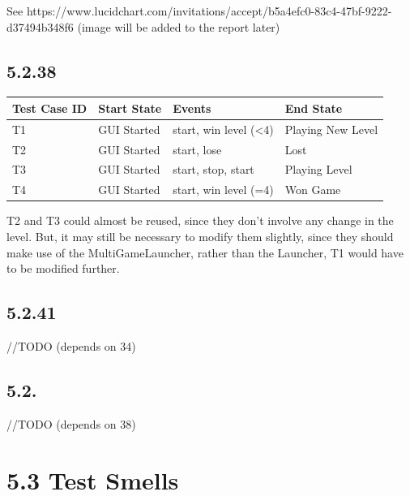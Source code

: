 \documentclass[]{article}
\begin{document}
See
https://www.lucidchart.com/invitations/accept/b5a4efc0-83c4-47bf-9222-d37494b348f6
(image will be added to the report later)

\subsection{5.2.38}\label{section-23}

\begin{longtable}[]{@{}llll@{}}
\toprule
Test Case ID & Start State & Events & End State\tabularnewline
\midrule
\endhead
T1 & GUI Started & start, win level (\textless{}4) & Playing New
Level\tabularnewline
T2 & GUI Started & start, lose & Lost\tabularnewline
T3 & GUI Started & start, stop, start & Playing Level\tabularnewline
T4 & GUI Started & start, win level (=4) & Won Game\tabularnewline
\bottomrule
\end{longtable}

T2 and T3 could almost be reused, since they don't involve any change in
the level. But, it may still be necessary to modify them slightly, since
they should make use of the MultiGameLauncher, rather than the Launcher,
T1 would have to be modified further.

\subsection{5.2.41}\label{section-24}

//TODO (depends on 34)

\subsection{5.2.}\label{section-25}

//TODO (depends on 38)

\section{5.3 Test Smells}\label{test-smells}
\end{document}
